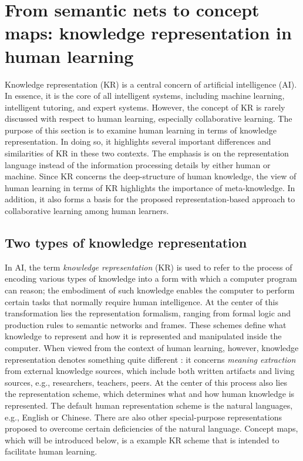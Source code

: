 \section{From semantic nets to concept maps: knowledge representation in
human learning} 

Knowledge representation (KR) is a central concern of artificial
intelligence (AI). In essence, it is the core of all intelligent systems,
including machine learning, intelligent tutoring, and expert
systems. However, the concept of KR is rarely discussed with respect to
human learning, especially collaborative learning. The purpose of this
section is to examine human learning in terms of knowledge
representation. In doing so, it highlights several important differences
and similarities of KR in these two contexts.  The emphasis is on the
representation language instead of the information processing details by
either human or machine. Since KR concerns the deep-structure of human
knowledge, the view of human learning in terms of KR highlights the
importance of meta-knowledge. In addition, it also forms a basis for the
proposed representation-based approach to collaborative learning among
human learners.


\subsection{Two types of knowledge representation}

In AI, the term {\it knowledge representation\/} (KR) is used to refer to
the process of encoding various types of knowledge into a form with which a
computer program can reason; the embodiment of such knowledge enables the
computer to perform certain tasks that normally require human intelligence.
At the center of this transformation lies the representation formalism,
ranging from formal logic and production rules to semantic networks and
frames. These schemes define what knowledge to represent and how it is
represented and manipulated inside the computer. When viewed from the
context of human learning, however, knowledge representation denotes
something quite different : it concerns {\it meaning extraction\/} from
external knowledge sources, which include both written artifacts and living
sources, e.g., researchers, teachers, peers. At the center of this process
also lies the representation scheme, which determines what and how human
knowledge is represented. The default human representation scheme is the
natural languages, e.g., English or Chinese. There are also other
special-purpose representations proposed to overcome certain deficiencies
of the natural language. Concept maps, which will be introduced below, is a
example KR scheme that is intended to facilitate human learning.

